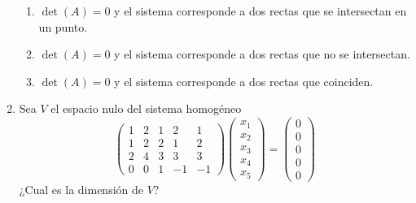 \documentclass{article}
\begin{document}
\begin{enumerate}
 \begin{enumerate}
     \item $\det(A) = 0$ y el sistema corresponde a dos rectas que se intersectan en un punto.
\item $\det(A) = 0$ y el sistema corresponde a dos rectas que no se intersectan.
\item $\det(A) = 0$ y el sistema corresponde a dos rectas que coinciden.
 \end{enumerate}
\item Sea $V$ el espacio nulo del sistema homogéneo
\[
\begin{pmatrix}
1 & 2 & 1 & 2 & 1 \\ 1 & 2 & 2 & 1 & 2
\\ 2 & 4 & 3 & 3 & 3\\
0 & 0 & 1 & -1 & -1
\end{pmatrix}\begin{pmatrix}
x_1\\x_2\\x_3\\x_4\\x_5
\end{pmatrix}=\begin{pmatrix}
0\\0\\0\\0\\0
\end{pmatrix}
\]
¿Cual es la dimensión de $V$?
\end{enumerate}
\end{document}
